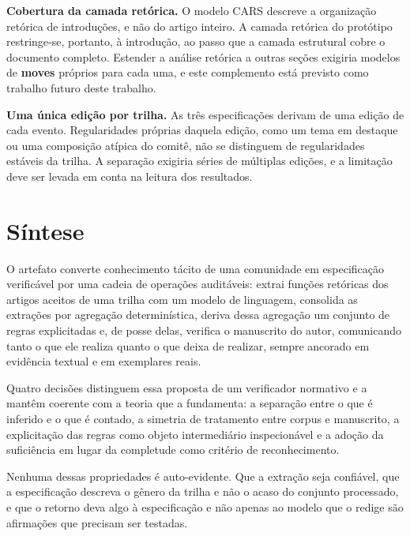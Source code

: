 \textbf{Cobertura da camada retórica.} O modelo CARS descreve a organização retórica de introduções, e não do artigo inteiro. A camada retórica do protótipo restringe-se, portanto, à introdução, ao passo que a camada estrutural cobre o documento completo. Estender a análise retórica a outras seções exigiria modelos de \textbf{moves} próprios para cada uma, e este complemento está previsto como trabalho futuro deste trabalho.

\textbf{Uma única edição por trilha.} As três especificações derivam de uma edição de cada evento. Regularidades próprias daquela edição, como um tema em destaque ou uma composição atípica do comitê, não se distinguem de regularidades estáveis da trilha. A separação exigiria séries de múltiplas edições, e a limitação deve ser levada em conta na leitura dos resultados.


\section{Síntese}
\label{sec:sintese-solucao}

O artefato converte conhecimento tácito de uma comunidade em especificação verificável por uma cadeia de operações auditáveis: extrai funções retóricas dos artigos aceitos de uma trilha com um modelo de linguagem, consolida as extrações por agregação determinística, deriva dessa agregação um conjunto de regras explicitadas e, de posse delas, verifica o manuscrito do autor, comunicando tanto o que ele realiza quanto o que deixa de realizar, sempre ancorado em evidência textual e em exemplares reais.

Quatro decisões distinguem essa proposta de um verificador normativo e a mantêm coerente com a teoria que a fundamenta: a separação entre o que é inferido e o que é contado, a simetria de tratamento entre corpus e manuscrito, a explicitação das regras como objeto intermediário inspecionável e a adoção da suficiência em lugar da completude como critério de reconhecimento.

Nenhuma dessas propriedades é auto-evidente. Que a extração seja confiável, que a especificação descreva o gênero da trilha e não o acaso do conjunto processado, e que o retorno deva algo à especificação e não apenas ao modelo que o redige são afirmações que precisam ser testadas.